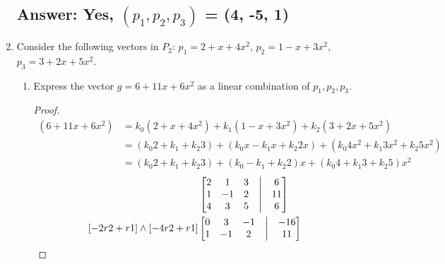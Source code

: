 \documentclass[12pt]{article}
\begin{document}
\begin{enumerate}
              \subsection{Answer: Yes, $(p_1,p_2,p_3)$ = (4, -5, 1)}
        \item Consider the following vectors in $P_2$: $p_1 = 2 + x + 4x^2$, $p_2 = 1 - x + 3x^2$, $p_3 = 3 + 2x + 5x^2$.
              \begin{enumerate}
                      \item Express the vector $g = 6 + 11x + 6x^2$ as a linear combination of $p_1,p_2,p_3$.
                            \begin{proof}
                                    \begin{align*}
                                            (6 + 11x + 6x^2) & =  k_{0}(2 + x + 4x^2) +  k_{1}(1 - x + 3x^2) +  k_{2}(3 + 2x + 5x^2)                                \\
                                                             & =  (k_{0}2 + k_{1} + k_{2}3)  +  (k_{0}x - k_{1}x + k_{2}2x)  +  (k_{0}4x^2 + k_{1}3x^2 + k_{2}5x^2) \\
                                                             & =  (k_{0}2 + k_{1} + k_{2}3)  +  (k_{0} - k_{1} + k_{2}2)x    +  (k_{0}4 + k_{1}3 + k_{2}5)x^2
                                    \end{align*}
                                    \begin{align*}
                                             &
                                            \begin{bmatrix}
                                                    2 & 1  & 3 & \bigm| & 6  \\
                                                    1 & -1 & 2 & \bigm| & 11 \\
                                                    4 & 3  & 5 & \bigm| & 6  \\
                                            \end{bmatrix} \\
                                            [-2r2+r1] \wedge [-4r2+r1]
                                             &
                                            \begin{bmatrix}
                                                    0 & 3  & -1 & \bigm| & -16 \\
                                                    1 & -1 & 2  & \bigm| & 11  \\

\end{bmatrix}
\end{align*}
\end{proof}
\end{enumerate}
\end{enumerate}
\end{document}

